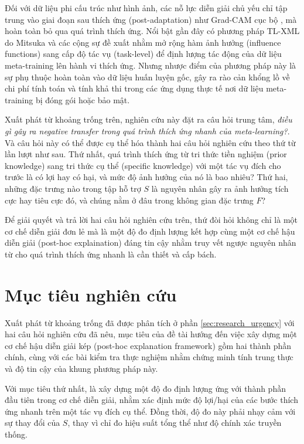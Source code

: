 Đối với dữ liệu phi cấu trúc như hình ảnh, các nỗ lực diễn giải chủ yếu chỉ tập trung vào giai đoạn sau thích ứng (post-adaptation) như Grad-CAM cục bộ \cite{uddin2025expert}, mà hoàn toàn bỏ qua quá trình thích ứng. Nổi bật gần đây có phương pháp TL-XML do Mitsuka và các cộng sự đề xuất \cite{mitsuka2025tlxml} nhằm mở rộng hàm ảnh hưởng (influence functions) sang cấp độ tác vụ (task-level) để định lượng tác động của dữ liệu meta-training lên hành vi thích ứng. Nhưng nhược điểm của phương pháp này là sự phụ thuộc hoàn toàn vào dữ liệu huấn luyện gốc, gây ra rào cản khổng lồ về chi phí tính toán và tính khả thi trong các ứng dụng thực tế nơi dữ liệu meta-training bị đóng gói hoặc bảo mật. 

Xuất phát từ khoảng trống trên, nghiên cứu này đặt ra câu hỏi trung tâm, \textit{điều gì gây ra negative transfer trong quá trình thích ứng nhanh của meta-learning?}. Và câu hỏi này có thể được cụ thể hóa thành hai câu hỏi nghiên cứu theo thứ từ lần lượt như sau. Thứ nhất, quá trình thích ứng từ tri thức tiền nghiệm (prior knowledge) sang tri thức cụ thể (specific knowledge) với một tác vụ đích cho trước là có lợi hay có hại, và mức độ ảnh hưởng của nó là bao nhiêu? Thứ hai, những đặc trưng nào trong tập hỗ trợ $S$ là nguyên nhân gây ra ảnh hưởng tích cực hay tiêu cực đó, và chúng nằm ở đâu trong không gian đặc trưng $F$?

Để giải quyết và trả lời hai câu hỏi nghiên cứu trên, thứ đòi hỏi không chỉ là một cơ chế diễn giải đơn lẻ mà là một độ đo định lượng kết hợp cùng một cơ chế hậu diễn giải (post-hoc explaination) đáng tin cậy nhằm truy vết ngược nguyên nhân từ cho quá trình thích ứng nhanh là cần thiết và cấp bách.

\section{Mục tiêu nghiên cứu}
\label{sec:objective}
Xuất phát từ khoảng trống đã được phân tích ở phần \ref{sec:research_urgency} với hai câu hỏi nghiên cứu đã nêu, mục tiêu của đề tài hướng đến việc xây dựng một cơ chế hậu diễn giải kép (post-hoc explanation framework) gồm hai thành phần chính, cùng với các bài kiểm tra thực nghiệm nhằm chứng minh tính trung thực và độ tin cậy của khung phương pháp này.

Với mục tiêu thứ nhất, là xây dựng một độ đo định lượng ứng với thành phần đầu tiên trong cơ chế diễn giải, nhằm xác định mức độ lợi/hại của các bước thích ứng nhanh trên một tác vụ đích cụ thể. Đồng thời, độ đo này phải nhạy cảm với sự thay đổi của $S$, thay vì chỉ đo hiệu suất tổng thể như độ chính xác truyền thống.

